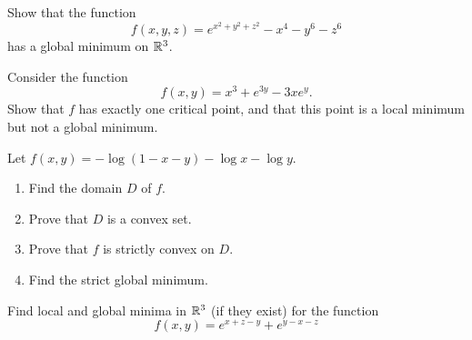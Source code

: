 \begin{problem}[Intermediate]\cite[p.35 \#26]{peressini1988mathematics}\label{problem:tricky}
Show that the function 
\begin{equation*}
f(x,y,z) = e^{x^2+y^2+z^2}-x^4-y^6-z^6
\end{equation*} 
has a global minimum on $\mathbb{R}^3$.
\end{problem}

\begin{problem}[Intermediate]\cite[p.36 \#33]{peressini1988mathematics}
Consider the function
\begin{equation*}
f(x,y) = x^3 + e^{3y} -3xe^y.
\end{equation*}
Show that $f$ has exactly one critical point, and that this point is a local minimum but not a global minimum.
\end{problem}

\begin{problem}[Basic]
Let $f(x,y) = -\log(1-x-y)-\log x -\log y$.
\begin{enumerate}
	\item Find the domain $D$ of $f$.
	\item Prove that $D$ is a convex set.
	\item Prove that $f$ is strictly convex on $D$.
	\item Find the strict global minimum.
\end{enumerate}
\end{problem}

\begin{problem}[Basic]\cite[p.81 \#27]{peressini1988mathematics}
Find local and global minima in $\mathbb{R}^3$ (if they exist) for the function 
\begin{equation*}
f(x,y) = e^{x+z-y}+e^{y-x-z}
\end{equation*}
\end{problem}

